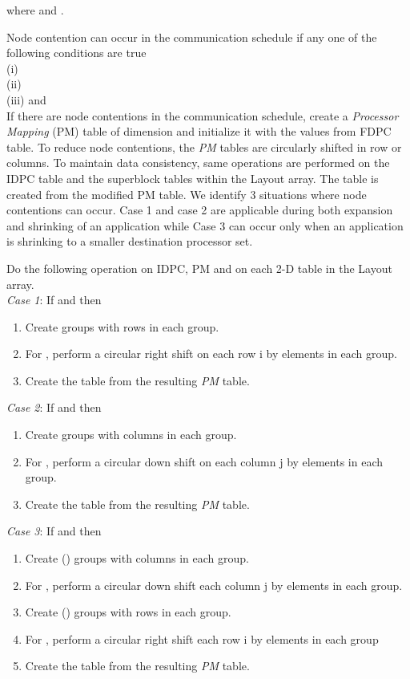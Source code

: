 \documentclass[letterpaper]{llncs}
\begin{document}
\begin{description}
\hspace{1.3in}{}

where  and  .

Node contention can occur in the  communication schedule if any one of the following conditions are true\\
(i)    \\
(ii)   \\
(iii)  and \\

If there are node contentions in the communication schedule, create a \textit{Processor Mapping} (PM) table  of dimension  and initialize it with the values from FDPC table.
To reduce node contentions, the \textit{PM} tables are circularly shifted in row or columns. To maintain data consistency, same operations 
are performed on the IDPC table and the superblock tables within the Layout array.
The  table is created from the modified PM table.
We identify 3 situations where node contentions can occur.
Case 1 and case 2 are applicable during both expansion and shrinking of an application 
while Case 3 can occur only when an application is shrinking to a smaller  destination processor set.

Do the following operation on IDPC, PM and on each 2-D table in the Layout array.\\
\noindent
\textit{Case 1}: If  and  then
\begin{enumerate}
\item Create  groups with  rows in each group.
\item For , perform a circular right shift on each row i by  elements in each group.
\item Create the  table from the resulting \textit{PM} table.
\end{enumerate}

\noindent
\textit{Case 2}: If  and  then
\begin{enumerate}
\item Create  groups with  columns in each group.
\item For , perform a circular down shift on each column j by  elements in each group.
\item Create the  table from the resulting \textit{PM} table.
\end{enumerate}

\noindent
\textit{Case 3}: If  and  then 
\begin{enumerate}
\item Create () groups with  columns in each group.
\item For , perform a circular down shift each column j by  elements in each group.
\item Create () groups with  rows in each group.
\item For , perform a circular right shift each row i by  elements in each group
\item Create the  table from the resulting \textit{PM} table.
\end{enumerate}


\end{description}
\end{document}
